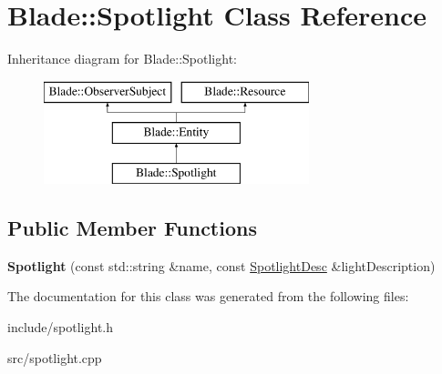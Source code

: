 \hypertarget{class_blade_1_1_spotlight}{}\section{Blade\+:\+:Spotlight Class Reference}
\label{class_blade_1_1_spotlight}
Inheritance diagram for Blade\+:\+:Spotlight\+:\begin{figure}[H]
\begin{center}
\leavevmode
\includegraphics[height=3.000000cm]{class_blade_1_1_spotlight}
\end{center}
\end{figure}
\subsection*{Public Member Functions}
\begin{DoxyCompactItemize}
\item 
\mbox{\label{class_blade_1_1_spotlight_a139961b5eb11b6a48a4c77aef2825b86}} 
{\bfseries Spotlight} (const std\+::string \&name, const \hyperlink{struct_blade_1_1_spotlight_desc}{Spotlight\+Desc} \&light\+Description)
\end{DoxyCompactItemize}


The documentation for this class was generated from the following files\+:\begin{DoxyCompactItemize}
\item 
include/spotlight.\+h\item 
src/spotlight.\+cpp\end{DoxyCompactItemize}
